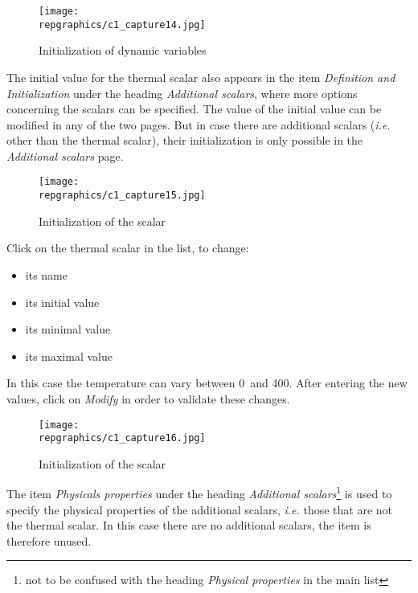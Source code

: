 \begin{figure}[ht]
\begin{center}
\texttt{[image: \\repgraphics/c1\_capture14.jpg]}
\caption{Initialization of dynamic variables}
\label{fig14_e1}
\end{center}
\end{figure}


\clearpage
The initial value for the thermal scalar also appears in the item
{\itshape Definition and Initialization} under the heading
{\itshape Additional scalars}, where more options concerning the scalars can be
specified. The value of the initial value can be modified in any of the two
pages. But in case there are additional scalars ({\em i.e.} other than the
thermal scalar), their initialization is only possible in the {\itshape
Additional scalars} page.

\begin{figure}[ht]
\begin{center}
\texttt{[image: \\repgraphics/c1\_capture15.jpg]}
\caption{Initialization of the scalar}
\label{fig15_e1}
\end{center}
\end{figure}


\clearpage
Click on the thermal scalar in the list, to change:
\begin{itemize}
        \item its name
        \item its initial value
        \item its minimal value
        \item its maximal value
\end{itemize}
In this case the temperature can vary between 0\degresC\ and 400\degresC.
After entering the new values, click on {\itshape Modify} in order to validate
these changes.

\begin{figure}[ht]
\begin{center}
\texttt{[image: \\repgraphics/c1\_capture16.jpg]}
\caption{Initialization of the scalar}
\label{fig16_e1}
\end{center}
\end{figure}

The item {\itshape Physicals properties} under the heading {\itshape Additional
scalars}\footnote{not to be confused with the heading {\itshape Physical
properties} in the main list} is used to specify the physical properties
of the additional scalars, {\em i.e.} those that are not the thermal scalar. In
this case there are no additional scalars, the item is therefore unused.


